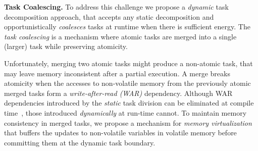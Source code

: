 
\textbf{Task Coalescing.} To address this challenge we propose a \emph{dynamic} task decomposition approach, that accepts any static decomposition and opportunistically \emph{coalesces} tasks at runtime when there is sufficient energy. The \emph{task coalescing} is a mechanism where atomic tasks are merged into a single (larger) task while preserving atomicity. 

Unfortunately, merging two atomic tasks might produce a non-atomic task, that may leave memory inconsistent after a partial execution. A merge breaks atomicity when the accesses to non-volatile memory from the previously atomic merged tasks form a \emph{write-after-read (WAR)} dependency.
%
%
Although WAR dependencies introduced by the \emph{static} task division can be eliminated at compile time~\cite{alpaca}, those introduced \emph{dynamically} at
run-time cannot. To maintain memory consistency in merged tasks, we propose a
mechanism for \emph{memory virtualization} that buffers the updates to non-volatile variables in volatile memory before committing them at the dynamic task boundary.
%

